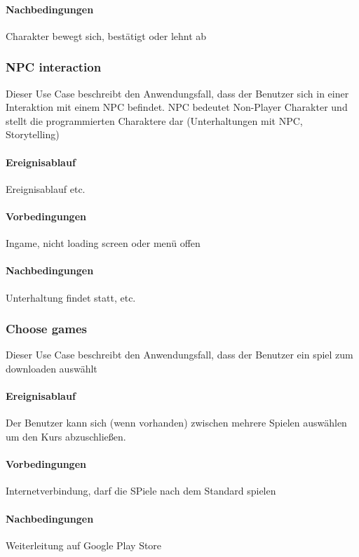 			\paragraph{Nachbedingungen}
				Charakter bewegt sich, bestätigt oder lehnt ab
	
		\subsubsection{NPC interaction}
			Dieser Use Case beschreibt den Anwendungsfall, dass der Benutzer sich in einer Interaktion mit einem NPC befindet. NPC bedeutet Non-Player Charakter und stellt die programmierten Charaktere dar (Unterhaltungen mit NPC, Storytelling)
			
			\paragraph{Ereignisablauf}
				Ereignisablauf etc.

			\paragraph{Vorbedingungen}
				Ingame, nicht loading screen oder menü offen
			
			\paragraph{Nachbedingungen}
				Unterhaltung findet statt, etc.
	
		\subsubsection{Choose games}
			Dieser Use Case beschreibt den Anwendungsfall, dass der Benutzer ein spiel zum downloaden auswählt
			
			\paragraph{Ereignisablauf}
				Der Benutzer kann sich (wenn vorhanden) zwischen mehrere Spielen auswählen um den Kurs abzuschließen.

			\paragraph{Vorbedingungen}
				Internetverbindung, darf die SPiele nach dem Standard spielen
			
			\paragraph{Nachbedingungen}
				Weiterleitung auf Google Play Store

